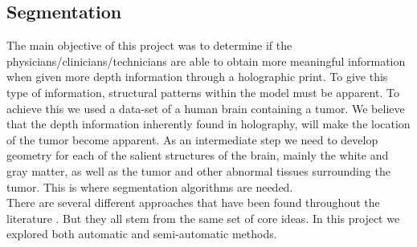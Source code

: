 \subsection{Segmentation}

The main objective of this project was to determine if the physicians/clinicians/technicians are able to obtain more meaningful information when given more depth information through a holographic print.  To give this type of information, structural patterns within the model must be apparent. To achieve this we used a data-set of a human brain containing a tumor. We believe that the depth information inherently found in holography, will make the location of the tumor become apparent.  As an intermediate step we need to develop geometry for each of the salient structures of the brain, mainly the white and gray matter, as well as the tumor and other abnormal tissues surrounding the tumor.  This is where segmentation algorithms are needed.\\

There are several different approaches that have been found throughout the literature \cite{pham2000current}.  But they all stem from the same set of core ideas.  In this project we explored both automatic and semi-automatic methods.



